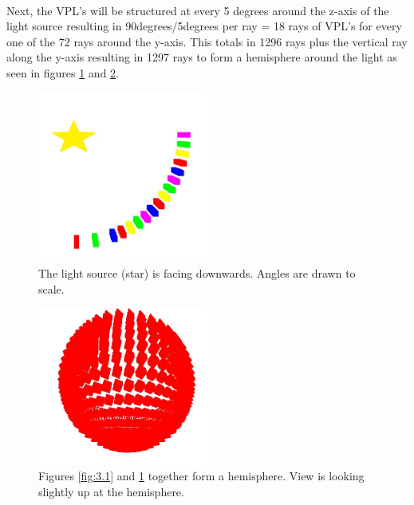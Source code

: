 \paragraph{}
Next, the VPL's will be structured at every 5 degrees around the z-axis of the light source resulting in 90degrees/5degrees per ray = 18 rays of VPL's for every one of the 72 rays around the y-axis.  This totals in 1296 rays plus the vertical ray along the y-axis resulting in 1297 rays to form a hemisphere around the light as seen in figures \ref{fig:3.2} and \ref{fig:3.3}.

\begin{figure}[h!]
  \centering
    \includegraphics[width=0.5\textwidth]{Figure32.jpg}
  \caption{The light source (star) is facing downwards. Angles are drawn to scale.}
	\label{fig:3.2}
\end{figure}


\begin{figure}[h!]
  \centering
    \includegraphics[width=0.5\textwidth]{Figure33.jpg}
  \caption{Figures \ref{fig:3.1} and \ref{fig:3.2} together form a hemisphere. View is looking slightly up at the hemisphere.}
	\label{fig:3.3}
\end{figure}

